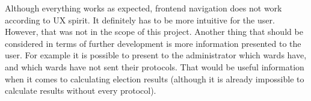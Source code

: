 \documentclass[a4paper,twoside,12pt]{book}
\newcounter{PagesWithoutNumbers}
\begin{document}
  Although everything works as expected, frontend navigation does not work according to UX spirit.
  It definitely has to be more intuitive for the user. However, that was not in the scope of this project.
  Another thing that should be considered in terms of further development is more information presented to the user.
  For example it is possible to present to the administrator which wards have, and which wards have not sent their protocols.
  That would be useful information when it comes to calculating election results (although it is already impossible to calculate results without every protocol).  

\backmatter
{}
\setcounter{page}{\value{PagesWithoutNumbers}}

\pagestyle{onlyPageNumbers}




\end{document}
